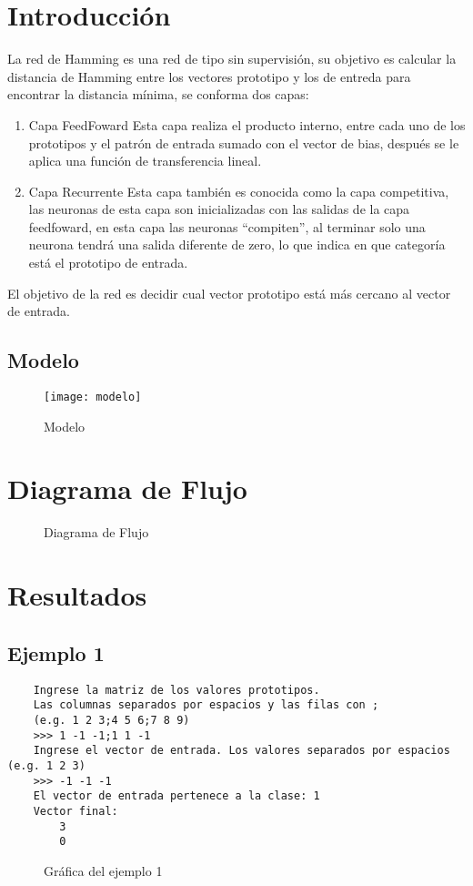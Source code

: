\documentclass{article}
\begin{document}
\maketitle
\tableofcontents
\section{Introducción}
La red de Hamming es una red de tipo sin supervisión, su objetivo es calcular la distancia de Hamming entre los vectores prototipo y los de entreda para encontrar la distancia mínima, se conforma dos capas:
\begin{enumerate}
	\item Capa FeedFoward
	Esta capa realiza el producto interno, entre cada uno de los prototipos y el patrón de entrada sumado con el vector de bias, después se le aplica una función de transferencia lineal.
	\item Capa Recurrente
	Esta capa también es conocida como la capa competitiva, las neuronas de esta capa son inicializadas  con las salidas de la capa feedfoward, en esta capa las neuronas ``compiten'', al terminar solo una neurona tendrá una salida diferente de zero, lo que indica en que categoría está el prototipo de entrada.
\end{enumerate}
El objetivo de la red es decidir cual vector prototipo está más cercano al vector de entrada.
\newpage
\subsection{Modelo}
\begin{figure}[h!]
	\caption{Modelo}
	\centering
	\texttt{[image: modelo]}
\end{figure}
\newpage
\section{Diagrama de Flujo}
\begin{figure}[htpb]
	\centering
	
	\caption{Diagrama de Flujo}
\end{figure}
\newpage
\section{Resultados}
\subsection{Ejemplo 1}
\begin{lstlisting}
	Ingrese la matriz de los valores prototipos. 
	Las columnas separados por espacios y las filas con ;  
	(e.g. 1 2 3;4 5 6;7 8 9)
	>>> 1 -1 -1;1 1 -1
	Ingrese el vector de entrada. Los valores separados por espacios (e.g. 1 2 3)
	>>> -1 -1 -1
	El vector de entrada pertenece a la clase: 1
	Vector final:
		3
		0
\end{lstlisting}
\begin{figure}[htpb]
	\centering
	
	\caption{Gráfica del ejemplo 1}
\end{figure}
\newpage
\end{document}
